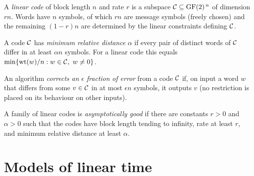 
\begin{definition}
  \label{def:linear-code}
  A \emph{linear code} of block length $n$ and rate $r$ is a subspace
  $\mathcal{C} \subseteq \mathrm{GF}(2)^{\,n}$ of dimension $rn$. Words have $n$ symbols, of
  which $rn$ are message symbols (freely chosen) and the remaining $(1-r)n$ are
  determined by the linear constraints defining $\mathcal{C}$.
\end{definition}

\begin{definition}
  \label{def:relative-distance}
  A code $\mathcal{C}$ has \emph{minimum relative distance} $\alpha$ if every pair of
  distinct words of $\mathcal{C}$ differ in at least $\alpha n$ symbols. For a linear
  code this equals $\min\{\operatorname{wt}(w)/n : w \in \mathcal{C},\ w \neq 0\}$.
\end{definition}

\begin{definition}
  \label{def:correct-error}
  An algorithm \emph{corrects an $\epsilon$ fraction of error} from a code
  $\mathcal{C}$ if, on input a word $w$ that differs from some $v \in \mathcal{C}$ in at
  most $\epsilon n$ symbols, it outputs $v$ (no restriction is placed on its
  behaviour on other inputs).
\end{definition}

\begin{definition}
  \label{def:asymptotically-good}
  A family of linear codes is \emph{asymptotically good} if there are constants
  $r>0$ and $\alpha>0$ such that the codes have block length tending to
  infinity, rate at least $r$, and minimum relative distance at least $\alpha$.
\end{definition}

\chapter{Models of linear time}


